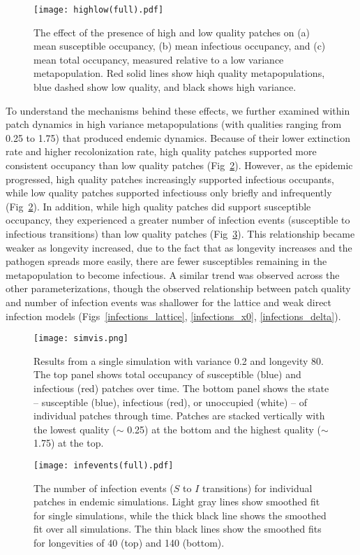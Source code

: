 \documentclass{svjour3}
\begin{document}
\begin{figure}
\centering
\texttt{[image: highlow(full).pdf]}
\caption{The effect of the presence of high and low quality patches on (a) mean susceptible occupancy, (b) mean infectious occupancy, and (c) mean total occupancy, measured relative to  a low variance metapopulation.  Red solid lines show hiqh quality metapopulations, blue dashed show low quality, and black shows high variance.}
\label{sens}
\end{figure}

To understand the mechanisms behind these effects, we further examined within patch dynamics in high variance metapopulations (with qualities ranging from 0.25 to 1.75) that produced endemic dynamics.  Because of their lower extinction rate and higher recolonization rate, high quality patches supported more consistent occupancy than low quality patches (Fig~\ref{simvis}).  However, as the epidemic progressed, high quality patches increasingly supported infectious occupants, while low quality patches supported infectiouss only briefly and infrequently (Fig~\ref{simvis}).  In addition, while high quality patches did support susceptible occupancy, they experienced a greater number of infection events (susceptible to infectious transitions) than low quality patches (Fig~\ref{infections}).  This relationship became weaker as longevity increased, due to the fact that as longevity increases and the pathogen spreads more easily, there are fewer susceptibles remaining in the metapopulation to become infectious.  A similar trend was observed across the other parameterizations, though the observed relationship between patch quality and number of infection events was shallower for the lattice and weak direct infection models (Figs~\ref{infections_lattice}, \ref{infections_x0}, \ref{infections_delta}).

\begin{figure}
\centering
\texttt{[image: simvis.png]}
\caption{Results from a single simulation with variance 0.2 and longevity 80.  The top panel shows total occupancy of susceptible (blue) and infectious (red) patches over time.  The bottom panel shows the state -- susceptible (blue), infectious (red), or unoccupied (white) -- of individual patches through time.  Patches are stacked vertically with the lowest quality ($\sim$ 0.25) at the bottom and the highest quality ($\sim$ 1.75) at the top.}
\label{simvis}
\end{figure}


\begin{figure}
\centering
\texttt{[image: infevents(full).pdf]}
\caption{The number of infection events ($S$ to $I$ transitions) for individual patches in endemic simulations.  Light gray lines show smoothed fit for single simulations, while the thick black line shows the smoothed fit over all simulations.  The thin black lines show the smoothed fits for longevities of 40 (top) and 140 (bottom).}
\label{infections}
\end{figure}
\end{document}
